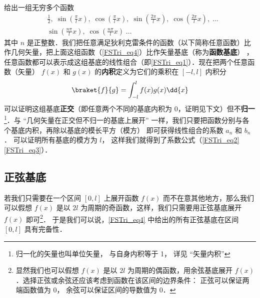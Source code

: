 % 

给出一组无穷多个函数
\begin{equation}\label{FSTri_eq4}
\begin{aligned}
&\frac12,\;   \sin(\frac{\pi}{l} x),\;   \cos(\frac{\pi}{l} x),\;   \sin(\frac{2\pi}{l} x),\;   \cos(\frac{2\pi}{l} x),\;   \dots\\
&\sin(\frac{n\pi}{l} x),\;   \cos(\frac{n\pi}{l} x)\;   \dots
\end{aligned}\end{equation}
其中 $n$ 是正整数．我们把任意满足狄利克雷条件的函数（以下简称任意函数）比作几何矢量，把上面这组函数（\autoref{FSTri_eq4}）比作矢量基底（称为\textbf{函数基底}）
，任意函数都可以表示成这组基底的线性组合（即\autoref{FSTri_eq1}）．现在把两个任意函数（矢量） $f(x)$ 和 $g(x)$ 的\textbf{内积}定义为它们的乘积在 $[-l,l]$ 内积分
\begin{equation}
\braket{f}{g} = \int_{-l}^{l} f(x) g(x) \dd{x}
\end{equation}
可以证明这组基底\textbf{正交}（即任意两个不同的基底内积为 0，证明见下文）但不\textbf{归一}\footnote{归一化的矢量也叫单位矢量， 与自身内积等于 1， 详见 “矢量内积”}．与 “几何矢量在正交但不归一的基底上展开” 一样，我们只要把函数分别与各个基底内积，再除以基底的模长平方（模方）
即可获得线性组合的系数 $a_n$ 和 $b_n$． 可以证明所有基底的模方为 $l$， 这样我们就得到了系数公式（\autoref{FSTri_eq2} \autoref{FSTri_eq3}）．


\subsection{正弦基底}
若我们只需要在一个区间 $[0,l]$ 上展开函数 $f(x)$ 而不在意其他地方，那么我们可以假想 $f(x)$ 是以 $2l$ 为周期的奇函数，这样，我们只需要用正弦基底展开 $f(x)$ 即可\footnote{显然我们也可以假想 $f(x)$ 是以 $2l$ 为周期的偶函数，用余弦基底展开 $f(x)$．选择正弦或余弦还应该考虑到函数在该区间的边界条件： 正弦可以保证两端函数值为 0， 余弦可以保证区间的导数值为 0．}． 于是我们可以说，\autoref{FSTri_eq4} 中给出的所有正弦基底在区间 $[0,l]$ 具有完备性．

